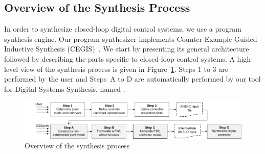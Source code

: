 \documentclass{sig-alternate-05-2015}
\begin{document}
\subsection{Overview of the Synthesis Process}
\label{verification-flow}

In order to synthesize closed-loop digital control systems, we use a program
synthesis engine.  Our program synthesizer implements Counter-Example Guided
Inductive Synthesis (CEGIS)~\cite{sketch}.  We start by presenting its
general architecture followed by describing the parts specific to
closed-loop control systems.  A high-level view of the synthesis process is
given in Figure~\ref{DSSynth_process}.  Steps $1$ to $3$ are performed by
the user and Steps~A to D are automatically performed by our tool for
Digital Systems Synthesis, named \tool.
%

\begin{figure}[t]
\centering
\includegraphics[width=\textwidth]{figures/verification-flow.png}
\vspace{1ex}
\caption{Overview of the synthesis process\label{DSSynth_process}}
\end{figure}

\end{document}
